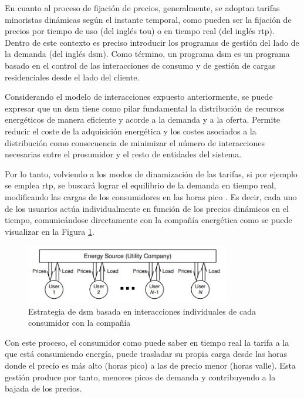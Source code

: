 \vspace{1mm}

En cuanto al proceso de fijación de precios, generalmente, se adoptan tarifas minoristas dinámicas según el instante temporal, como pueden ser la fijación de precios por tiempo de uso (del inglés \gls{tou}) o en tiempo real (del inglés \gls{rtp}). Dentro de este contexto es preciso introducir los programas de gestión del lado de la demanda (del inglés \gls{dsm}). Como término, un programa \gls{dsm} es un programa basado en el control de las interacciones de consumo y de gestión de cargas residenciales desde el lado del cliente. 

\vspace{3mm}

Considerando el modelo de interacciones expuesto anteriormente, se puede expresar que un \gls{dsm} tiene como pilar fundamental la distribución de recursos energéticos de manera eficiente y acorde a la demanda y a la oferta. Permite reducir el coste de la adquisición energética y los costes asociados a la distribución como consecuencia de minimizar el número de interacciones necesarias entre el prosumidor y el resto de entidades del sistema. \cite{dsm}

\vspace{3mm}

Por lo tanto, volviendo a los modos de dinamización de las tarifas, si por ejemplo se emplea \gls{rtp}, se buscará lograr el equilibrio de la demanda en tiempo real, modificando las cargas de los consumidores en las horas pico \cite{rtp}. Es decir, cada uno de los usuarios actúa individualmente en función de los precios dinámicos en el tiempo, comunicándose directamente con la compañía energética como se puede visualizar en la Figura \ref{fig:dsm1}. 

\begin{figure}[h!]
  \centering
  \includegraphics[width=0.8\textwidth]{img/teoria/dsm1.png}
  \caption{Estrategia de \gls{dsm} basada en interacciones individuales de cada consumidor con la compañía \cite{pricing}}
  \label{fig:dsm1}
\end{figure}

Con este proceso, el consumidor como puede saber en tiempo real la tarifa a la que está consumiendo energía, puede trasladar su propia carga desde las horas donde el precio es más alto (horas pico) a las de precio menor (horas valle). Esta gestión produce por tanto, menores picos de demanda y contribuyendo a la bajada de los precios. \cite{dsm} \cite{pricing}

